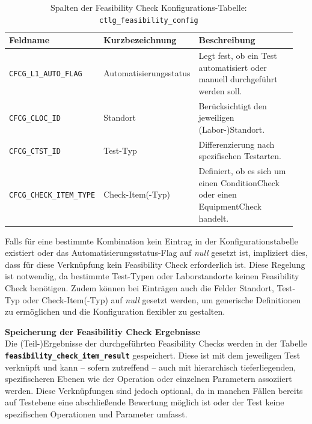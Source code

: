 \begin{table}[htbp]
    \centering
    \caption{Spalten der Feasibility Check Konfigurations-Tabelle: \texttt{ctlg\_feasibility\_config}}
    \footnotesize
    \renewcommand{\arraystretch}{1.2}
    \begin{tabular}{p{0.3\linewidth} p{0.3\linewidth} p{0.35\linewidth}}
        \toprule
        \textbf{Feldname} & \textbf{Kurzbezeichnung} & \textbf{Beschreibung} \\
        \midrule
        \texttt{CFCG\_L1\_AUTO\_FLAG} & Automatisierungsstatus & Legt fest, ob ein Test automatisiert oder manuell durchgeführt werden soll. \\
        \midrule
        \texttt{CFCG\_CLOC\_ID} & Standort & Berücksichtigt den jeweiligen (Labor-)Standort. \\
        \midrule
        \texttt{CFCG\_CTST\_ID} & Test-Typ & Differenzierung nach spezifischen Testarten. \\
        \midrule
        \texttt{CFCG\_CHECK\_ITEM\_TYPE} & Check-Item(-Typ) & Definiert, ob es sich um einen \gls{ConditionCheck} oder einen \gls{EquipmentCheck} handelt. \\
        \bottomrule
    \end{tabular}
    \label{tab:config-fields}
\end{table}

Falls für eine bestimmte Kombination kein Eintrag in der Konfigurationstabelle existiert oder das Automatisierungsstatus-Flag auf \textit{null} gesetzt ist, impliziert dies, dass für diese Verknüpfung kein Feasibility Check erforderlich ist. Diese Regelung ist notwendig, da bestimmte Test-Typen oder Laborstandorte keinen Feasibility Check benötigen. Zudem können bei Einträgen auch die Felder Standort, Test-Typ oder Check-Item(-Typ) auf \textit{null} gesetzt werden, um generische Definitionen zu ermöglichen und die Konfiguration flexibler zu gestalten.

\textbf{Speicherung der Feasibilitiy Check Ergebnisse} \\
Die (Teil-)Ergebnisse der durchgeführten Feasibility Checks werden in der Tabelle \textbf{\texttt{feasibility\_check\_item\_result}} gespeichert. Diese ist mit dem jeweiligen Test verknüpft und kann – sofern zutreffend – auch mit hierarchisch tieferliegenden, spezifischeren Ebenen wie der Operation oder einzelnen Parametern assoziiert werden. Diese Verknüpfungen sind jedoch optional, da in manchen Fällen bereits auf Test\-ebene eine abschließende Bewertung möglich ist oder der Test keine spezifischen Operationen und Parameter umfasst.

